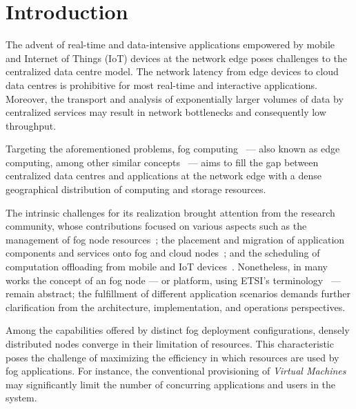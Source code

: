 \section{Introduction}

The advent of real-time and data-intensive applications empowered by mobile and Internet of Things (IoT) devices 
at the network edge 
poses challenges to the centralized data centre model. The network latency from edge devices to cloud data centres is prohibitive for most real-time and interactive applications.
Moreover, the transport and analysis of exponentially larger volumes of data by centralized services may result in network bottlenecks and consequently low throughput. 

Targeting the aforementioned problems, fog computing~\cite{Bonomi:2012} --- also known as edge computing, among other similar concepts~\cite{Satyanarayanan:2009,Taleb:2013,ETSI:MEC:2016:03} --- aims to fill the gap between centralized data centres and applications at the network edge with a dense geographical distribution of computing and storage resources.

The intrinsic challenges for its realization brought attention from the research community, whose contributions focused on various aspects such as the management of fog node resources~\cite{N.Wang:2017}; the placement and migration of application components and services onto fog and cloud nodes~\cite{Wang:2015a,Wang:2017,Machen:2018}; and the scheduling of computation offloading from mobile and IoT devices~\cite{Liu:2016, OrsiniBL16}. 
Nonetheless, in many works the concept of an fog node --- or platform, using ETSI's terminology~\cite{ETSI:MEC:2016:03} --- remain abstract; the fulfillment of different application scenarios demands further clarification from the architecture, implementation, and operations perspectives.

Among the capabilities offered by distinct fog deployment configurations, densely distributed nodes converge in their limitation of resources. This characteristic poses the challenge of maximizing the efficiency in which resources are used by fog applications. For instance, the conventional provisioning of \textit{Virtual Machines} may significantly limit the number of concurring applications and users in the system.





